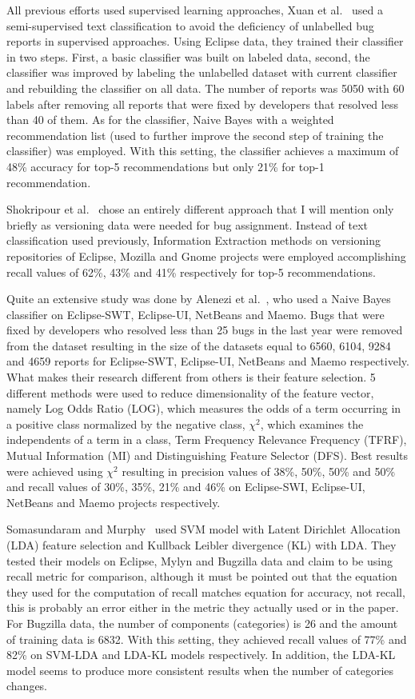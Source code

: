 All previous efforts used supervised learning approaches, Xuan et al.~\cite{Xuan2010} used a semi-supervised text classification to avoid the deficiency of unlabelled bug reports in supervised approaches. Using Eclipse data, they trained their classifier in two steps. First, a basic classifier was built on labeled data, second, the classifier was improved by labeling the unlabelled dataset with current classifier and rebuilding the classifier on all data. The number of reports was 5050 with 60 labels after removing all reports that were fixed by developers that resolved less than 40 of them. As for the classifier, Naive Bayes with a weighted recommendation list (used to further improve the second step of training the classifier) was employed. With this setting, the classifier achieves a maximum of 48\% accuracy for top-5 recommendations but only 21\% for top-1 recommendation.

Shokripour et al.~\cite{Shokripour2011} chose an entirely different approach that I will mention only briefly as versioning data were needed for bug assignment. Instead of text classification used previously, Information Extraction methods on versioning repositories of Eclipse, Mozilla and Gnome projects were employed accomplishing recall values of 62\%, 43\% and 41\% respectively for top-5 recommendations.

Quite an extensive study was done by Alenezi et al.~\cite{Alenezi2013}, who used a Naive Bayes classifier on Eclipse-SWT, Eclipse-UI, NetBeans and Maemo. Bugs that were fixed by developers who resolved less than 25 bugs in the last year were removed from the dataset resulting in the size of the datasets equal to 6560, 6104, 9284 and 4659 reports for Eclipse-SWT, Eclipse-UI, NetBeans and Maemo respectively. What makes their research different from others is their feature selection. 5 different methods were used to reduce dimensionality of the feature vector, namely Log Odds Ratio (LOG), which measures the odds of a term occurring in a positive class normalized by the negative class, $\chi^2$, which examines the independents of a term in a class, Term Frequency Relevance Frequency (TFRF), Mutual Information (MI) and Distinguishing Feature Selector (DFS). Best results were achieved using $\chi^2$ resulting in precision values of 38\%, 50\%, 50\% and 50\% and recall values of 30\%, 35\%, 21\% and 46\% on Eclipse-SWI, Eclipse-UI, NetBeans and Maemo projects respectively.

Somasundaram and Murphy~\cite{Somasundaram2012} used SVM model with Latent Dirichlet Allocation (LDA) feature selection and Kullback Leibler divergence (KL) with LDA. They tested their models on Eclipse, Mylyn and Bugzilla data and claim to be using recall metric for comparison, although it must be pointed out that the equation they used for the computation of recall matches equation for accuracy, not recall, this is probably an error either in the metric they actually used or in the paper. For Bugzilla data, the number of components (categories) is 26 and the amount of training data is 6832. With this setting, they achieved recall values of 77\% and 82\% on SVM-LDA and LDA-KL models respectively. In addition, the LDA-KL model seems to produce more consistent results when the number of categories changes.

